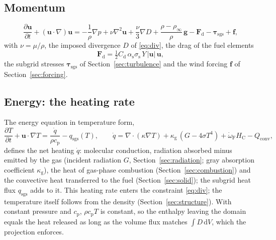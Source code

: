 \documentclass[11pt,a4paper]{article}
\newcommand{\vu}{\mathbf{u}}
\newcommand{\dd}{\,\mathrm{d}}
\begin{document}
\subsection{Momentum}
\begin{equation}\label{eq:momentum}
  \frac{\partial\vu}{\partial t} + (\vu\cdot\nabla)\vu
  = -\frac{1}{\rho}\nabla p + \nu\nabla^2\vu + \frac{\nu}{3}\nabla D
  + \frac{\rho-\rho_\infty}{\rho}\,\mathbf{g} - \mathbf{F}_\text{d} - \boldsymbol{\tau}_\text{sgs} + \mathbf{f},
\end{equation}
with $\nu=\mu/\rho$, the imposed divergence $D$ of \eqref{eq:div}, the drag of the fuel elements
\begin{equation}
  \mathbf{F}_\text{d} = \tfrac12 C_\text{d}\,\alpha_\text{s}\sigma_\text{s}\,Y\,|\vu|\,\vu,
\end{equation}
the subgrid stresses $\boldsymbol{\tau}_\text{sgs}$ of Section~\ref{sec:turbulence} and the wind forcing
$\mathbf f$ of Section~\ref{sec:forcing}.

\subsection{Energy: the heating rate}
The energy equation in temperature form,
\begin{equation}\label{eq:energy}
  \frac{\partial T}{\partial t} + \vu\cdot\nabla T = \frac{\dot q}{\rho c_\text{p}} - q_\text{sgs}(T),\qquad
  \dot q = \nabla\cdot(\kappa\nabla T) + \kappa_\text{g}\,(G-4\sigma T^4) + \dot\omega_\text{F} H_\text{C} - Q_\text{conv},
\end{equation}
defines the net heating $\dot q$: molecular conduction, radiation absorbed minus emitted by the gas
(incident radiation $G$, Section~\ref{sec:radiation}; gray absorption coefficient $\kappa_\text{g}$), the heat
of gas-phase combustion (Section~\ref{sec:combustion}) and the convective heat transferred to the fuel
(Section~\ref{sec:solid}); the subgrid heat flux $q_\text{sgs}$ adds to it. This heating rate enters the
constraint \eqref{eq:div}; the temperature itself follows from the density (Section~\ref{sec:structure}).
With constant pressure and $c_\text{p}$, $\rho c_\text{p}T$ is constant, so the enthalpy leaving the domain equals the
heat released as long as the volume flux matches $\int D\dd V$, which the projection enforces.
\end{document}
